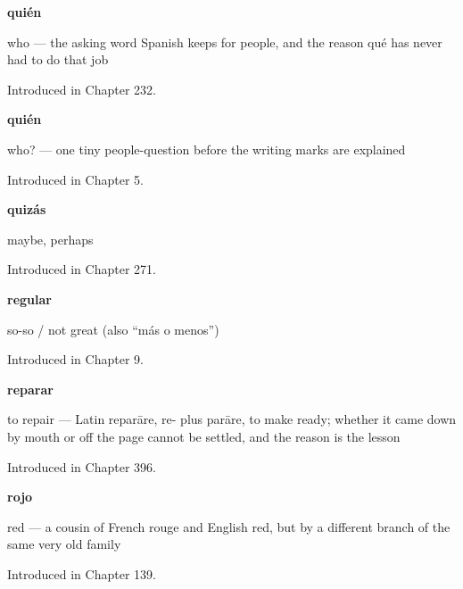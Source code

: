 \noindent\begin{minipage}[t]{\linewidth}
\raggedright
\textbf{quién}\par
\small who — the asking word Spanish keeps for people, and the reason qué has never had to do that job\par
\footnotesize Introduced in Chapter 232.
\end{minipage}\par\medskip

\noindent\begin{minipage}[t]{\linewidth}
\raggedright
\textbf{quién}\par
\small who? — one tiny people-question before the writing marks are explained\par
\footnotesize Introduced in Chapter 5.
\end{minipage}\par\medskip

\noindent\begin{minipage}[t]{\linewidth}
\raggedright
\textbf{quizás}\par
\small maybe, perhaps\par
\footnotesize Introduced in Chapter 271.
\end{minipage}\par\medskip

\noindent\begin{minipage}[t]{\linewidth}
\raggedright
\textbf{regular}\par
\small so-so / not great (also \textquotedblleft{}más o menos\textquotedblright{})\par
\footnotesize Introduced in Chapter 9.
\end{minipage}\par\medskip

\noindent\begin{minipage}[t]{\linewidth}
\raggedright
\textbf{reparar}\par
\small to repair — Latin reparāre, re- plus parāre, to make ready; whether it came down by mouth or off the page cannot be settled, and the reason is the lesson\par
\footnotesize Introduced in Chapter 396.
\end{minipage}\par\medskip

\noindent\begin{minipage}[t]{\linewidth}
\raggedright
\textbf{rojo}\par
\small red — a cousin of French rouge and English red, but by a different branch of the same very old family\par
\footnotesize Introduced in Chapter 139.
\end{minipage}\par\medskip

